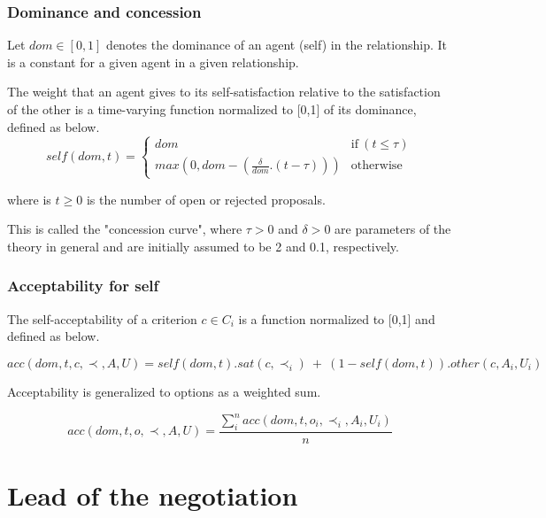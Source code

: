\documentclass{article}
\begin{document}
	\subsubsection{Dominance and concession}
	Let  $dom \in [0, 1] $ denotes the dominance of an agent (self) in the 	relationship.  It is a constant for a given agent in a given relationship.
	
	The weight that an agent gives to its self-satisfaction relative to	the satisfaction of the other is a time-varying function normalized to 	[0,1] of its dominance, defined as below.
		$$self(dom, t) = \left\{\begin{array}{ll}
		dom & \mathrm{if\ } (t \leq \tau)\\
		max(0, dom - (\frac{\delta}{dom} . (t - \tau))) & \mathrm{otherwise}
		\end{array}\right.$$
		
	
	where is $t \geq 0$ is the number of open or rejected proposals.
	
	This is called the "concession curve", where $\tau > 0$ and $\delta > 0$
	are parameters of the theory in general and are initially assumed to
	be 2 and 0.1, respectively.
	\subsubsection{Acceptability for self}

	The self-acceptability of a criterion $c \in C_i$ is a function	normalized to [0,1] and defined as below.
	
	$$acc(dom, t, c, \prec, A, U) = self(dom, t) . sat(c, \prec_i) \ +\  (1 - self(dom, t)) . other(c, A_i, U_i)$$
	
	Acceptability is generalized to options as a weighted sum.
	
	$$acc(dom, t, o, \prec, A, U) = \frac{ \sum_{i}^{n} acc(dom, t, o_i, \prec_i, A_i, U_i) } {n}$$ 
	
	
	\section{Lead of the negotiation}
%	
	
%	
%	
%		
	
\end{document}
